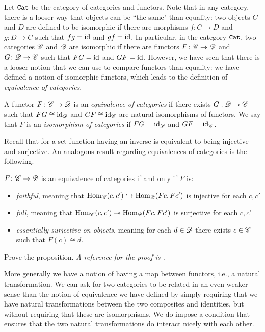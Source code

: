 \documentclass{article}[11pt]
\begin{document}
Let $\texttt{Cat}$ be the category of categories and functors. Note that in any category, there is a looser way that objects can be ``the same" than equality: two objects $C$ and $D$ are defined to be isomorphic if there are morphisms $f\colon C\to D$ and $g\colon D\to C$ such that $fg=\text{id}$ and $gf=\text{id}$. In particular, in the category $\texttt{Cat}$, two categories $\mathscr{C}$ and $\mathscr{D}$ are isomorphic if there are functors $F\colon \mathscr{C}\to \mathscr{D}$ and $G\colon \mathscr{D}\to \mathscr{C}$ such that $FG=\text{id}$ and $GF=\text{id}$. However, we have seen that there is a looser notion that we can use to compare functors than equality: we have defined a notion of isomorphic functors, which leads to the definition of \emph{equivalence of categories}.

\begin{definition}\label{equivcats} A functor $F\colon \mathscr{C} \to \mathscr{D}$ is an \textit{equivalence of categories} if there exists $G : \mathscr{D} \to \mathscr{C}$ such that $FG \cong \text{id}_{\mathscr{D}}$ and $GF\cong \text{id}_{\mathscr{C}}$ are natural isomorphisms of functors. We say that $F$ is an \textit{isomorphism of categories} if $FG = \text{id}_{\mathscr{D}}$ and $GF = \text{id}_{\mathscr{C}}$.
\end{definition}

Recall that for a set function having an inverse is equivalent to being injective and surjective. An analogous result regarding equivalences of categories is the following.

\begin{proposition} $F\colon \mathscr{C} \to \mathscr{D}$ is an equivalence of categories if and only if $F$ is:
\vspace{-1em}
\begin{itemize}\itemsep0em
	\item \textit{faithful}, meaning that $\textup{Hom}_{\mathscr{C}}(c,c') \xhookrightarrow{} \textup{Hom}_{\mathscr{D}}(Fc, Fc')$ is injective for each $c,c'$
	\item \textit{full}, meaning that $\textup{Hom}_{\mathscr{C}}(c,c') \twoheadrightarrow \textup{Hom}_{\mathscr{D}}(Fc,Fc')$ is surjective for each $c,c'$
	\item \textit{essentially surjective on objects}, meaning for each $d\in \mathscr{D}$ there exists $c\in \mathscr{C}$ such that $F(c) \cong d$.
\end{itemize}
\end{proposition}

\begin{exercise}
Prove the proposition. \emph{A reference for the proof is \cite[Proposition 1]{WOMP}.}
\end{exercise}

More generally we have a notion of having a map between functors, i.e., a natural transformation. We can ask for two categories to be related in an even weaker sense than the notion of equivalence we have defined by simply requiring that we have natural transformations between the two composites and identities, but without requiring that these are isomorphisms. We do impose a condition that ensures that the two natural transformations do interact nicely with each other.
\end{document}
